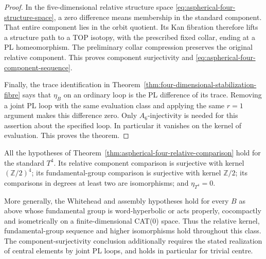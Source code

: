 \begin{proof}
In the five-dimensional relative structure space
\eqref{eq:aspherical-four-structure-space}, a zero
difference means membership in the standard component.
That entire component lies in the orbit quotient.
Its Kan fibration therefore lifts a structure path
to a TOP isotopy, with the prescribed fixed collar,
ending at a PL homeomorphism.  The preliminary collar
compression preserves the original relative component.
This proves component surjectivity and
\eqref{eq:aspherical-four-component-sequence}.

Finally, the trace identification in
Theorem~\ref{thm:four-dimensional-stabilization-fibre}
says that $\eta_B$ on an ordinary loop is the PL
difference of its trace.  Removing a joint PL loop
with the same evaluation class and applying the same
$r=1$ argument makes this difference zero.  Only
$A_6$-injectivity is needed for this assertion about
the specified loop.  In particular it vanishes on
the kernel of evaluation.  This proves the theorem.
\end{proof}

\begin{corollary}\label{cor:aspherical-four-explicit-groups}
All the hypotheses of
Theorem~\ref{thm:aspherical-four-relative-comparison}
hold for the standard $T^4$.  Its relative component
comparison is surjective with kernel $(\mathbb Z/2)^4$;
its fundamental-group comparison is surjective with
kernel $\mathbb Z/2$; its comparisons in degrees at
least two are isomorphisms; and $\eta_{T^4}=0$.

More generally, the Whitehead and assembly hypotheses
hold for every $B$ as above whose fundamental group
is word-hyperbolic or acts properly, cocompactly and
isometrically on a finite-dimensional CAT(0) space.
Thus the relative kernel, fundamental-group sequence
and higher isomorphisms hold throughout this class.
The component-surjectivity conclusion additionally
requires the stated realization of central elements
by joint PL loops, and holds in particular for
trivial centre.
\end{corollary}

